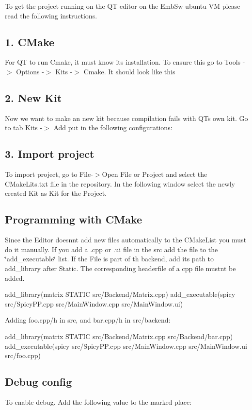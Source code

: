 To get the project running on the QT editor on the Emb\+Sw ubuntu VM please read the following instructions. \subsection*{1. C\+Make}

For QT to run Cmake, it must know its installation. To ensure this go to Tools -\/$>$ Options -\/$>$ Kits -\/$>$ Cmake. It should look like this 

\subsection*{2. New Kit}

Now we want to make an new kit because compilation fails with QT\textquotesingle{}s own kit. Go to tab Kits -\/$>$ Add put in the following configurations\+: 

\subsection*{3. Import project}

To import project, go to File-\/$>$Open File or Project and select the C\+Make\+Lits.\+txt file in the repository. In the following window select the newly created Kit as Kit for the Project. 

\subsection*{Programming with C\+Make}

Since the Editor doesnn\textquotesingle{}t add new files automatically to the C\+Make\+List you must do it manually. If you add a .cpp or .ui file in the src add the file to the \char`\"{}add\+\_\+executable\char`\"{} list. If the File is part of th backend, add its path to add\+\_\+library after Static. The corresponding headerfile of a cpp file mustn\textquotesingle{}t be added. 
\begin{DoxyCode}
add\_library(matrix STATIC src/Backend/Matrix.cpp)
add\_executable(spicy src/SpicyPP.cpp
                     src/MainWindow.cpp
                     src/MainWindow.ui)
\end{DoxyCode}
 Adding foo.\+cpp/h in src, and bar.\+cpp/h in src/backend\+: 
\begin{DoxyCode}
add\_library(matrix STATIC src/Backend/Matrix.cpp
                          src/Backend/bar.cpp)
add\_executable(spicy src/SpicyPP.cpp
                     src/MainWindow.cpp
                     src/MainWindow.ui
                     src/foo.cpp)
\end{DoxyCode}


\subsection*{Debug config}

To enable debug. Add the following value to the marked place\+:  